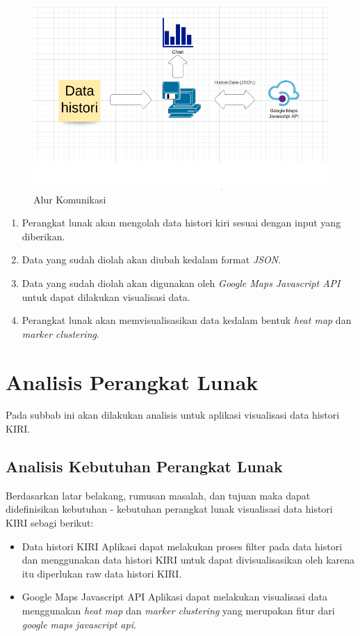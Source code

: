 \begin{figure}[H]
	\centering  
	\includegraphics[scale=0.55]{Gambar/software-flow.PNG}  
	\caption[Alur Komunikasi]{Alur Komunikasi} 
	\label{fig:alurKomunikasi} 
\end{figure} 

\begin{enumerate}
\item Perangkat lunak akan mengolah data histori kiri sesuai dengan input yang diberikan.
\item Data yang sudah diolah  akan diubah kedalam format \textit{JSON}.
\item Data yang sudah diolah akan digunakan oleh \textit{Google Maps Javascript API} untuk dapat dilakukan visualisasi data.
\item Perangkat lunak akan memvisualisasikan data kedalam bentuk \textit{heat map} dan \textit{marker clustering}.

\end{enumerate}


\section{Analisis Perangkat Lunak}
Pada subbab ini akan dilakukan analisis untuk aplikasi visualisasi data histori KIRI.
\subsection{Analisis Kebutuhan Perangkat Lunak}
\label{sec:analisisKebutuhanPerangkatLunak}
Berdasarkan latar belakang, rumusan masalah, dan tujuan maka dapat didefinisikan kebutuhan - kebutuhan perangkat lunak visualisasi data histori KIRI sebagi berikut:
\begin{itemize}
    \item Data histori KIRI
    Aplikasi dapat melakukan proses filter pada data histori dan menggunakan data histori KIRI untuk dapat divisualisasikan oleh karena itu diperlukan raw data histori KIRI.
    
    \item Google Maps Javascript API
    Aplikasi dapat melakukan visualisasi data menggunakan \textit{heat map} dan \textit{marker clustering} yang merupakan fitur dari \textit{google maps javascript api}.
    
\end{itemize}
